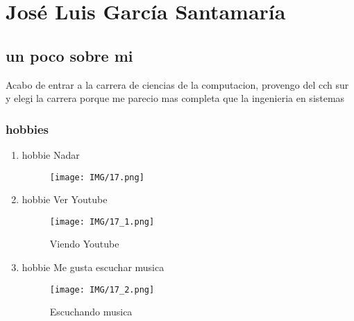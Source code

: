 \chapter{José Luis García Santamaría}

\section{un poco sobre mi}
Acabo de entrar a la carrera de ciencias de la computacion, provengo del cch sur y elegi la carrera porque me parecio mas completa que la ingenieria en sistemas

\subsection{hobbies}
\begin{enumerate}

\item hobbie Nadar

  \begin{figure}[h]
  \centering
  \texttt{[image: IMG/17.png]}
  \end{figure}

\item hobbie Ver Youtube

  \begin{figure}[h]
  \centering
  \texttt{[image: IMG/17\_1.png]}
  \caption{Viendo Youtube}
  \end{figure}
  
\item hobbie Me gusta escuchar musica

  \begin{figure}[h]
  \centering
  \texttt{[image: IMG/17\_2.png]}
  \caption{Escuchando musica}
\end{figure}
  
\end{enumerate}


